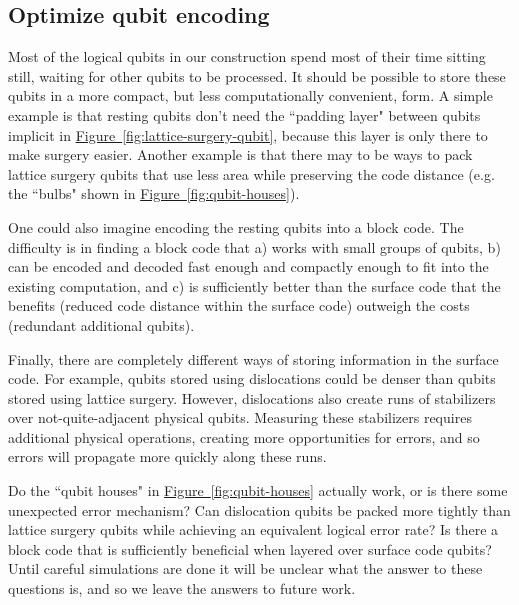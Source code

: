 \documentclass[superscriptaddress,notitlepage,longbibliography]{revtex4-1}
\theoremstyle{definition}
\theoremstyle{definition}
\newcommand{\fig}[1]{\hyperref[fig:#1]{Figure~\ref*{fig:#1}}}
\begin{document}
\subsection{Optimize qubit encoding}

Most of the logical qubits in our construction spend most of their time sitting still, waiting for other qubits to be processed.
It should be possible to store these qubits in a more compact, but less computationally convenient, form.
A simple example is that resting qubits don't need the ``padding layer" between qubits implicit in \fig{lattice-surgery-qubit}, because this layer is only there to make surgery easier.
Another example is that there may to be ways to pack lattice surgery qubits that use less area while preserving the code distance (e.g. the ``bulbs" shown in \fig{qubit-houses}).

One could also imagine encoding the resting qubits into a block code.
The difficulty is in finding a block code that a) works with small groups of qubits, b) can be encoded and decoded fast enough and compactly enough to fit into the existing computation, and c) is sufficiently better than the surface code that the benefits (reduced code distance within the surface code) outweigh the costs (redundant additional qubits).

Finally, there are completely different ways of storing information in the surface code.
For example, qubits stored using dislocations \cite{hastings2014dislocations} could be denser than qubits stored using lattice surgery.
However, dislocations also create runs of stabilizers over not-quite-adjacent physical qubits.
Measuring these stabilizers requires additional physical operations, creating more opportunities for errors, and so errors will propagate more quickly along these runs.

Do the ``qubit houses" in \fig{qubit-houses} actually work, or is there some unexpected error mechanism?
Can dislocation qubits be packed more tightly than lattice surgery qubits while achieving an equivalent logical error rate?
Is there a block code that is sufficiently beneficial when layered over surface code qubits?
Until careful simulations are done it will be unclear what the answer to these questions is, and so we leave the answers to future work.
\end{document}
